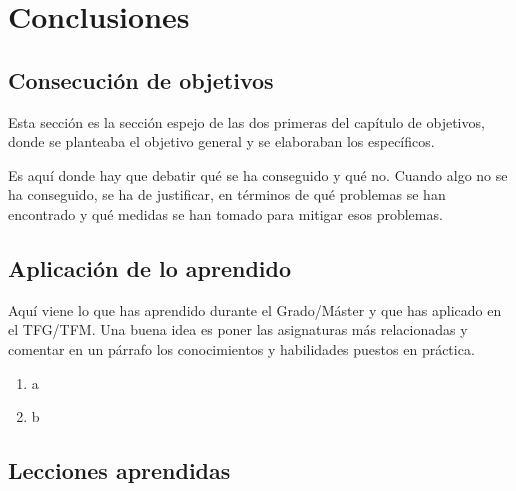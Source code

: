 \documentclass[a4paper, 12pt, english]{book}
\begin{document}




\cleardoublepage
\chapter{Conclusiones}
\label{chap:conclusiones}


\section{Consecución de objetivos}
\label{sec:consecucion-objetivos}

Esta sección es la sección espejo de las dos primeras del capítulo de objetivos, donde se planteaba el objetivo general y se elaboraban los específicos.

Es aquí donde hay que debatir qué se ha conseguido y qué no.
Cuando algo no se ha conseguido, se ha de justificar, en términos de qué problemas se han encontrado y qué medidas se han tomado para mitigar esos problemas.


\section{Aplicación de lo aprendido}
\label{sec:aplicacion}

Aquí viene lo que has aprendido durante el Grado/Máster y que has aplicado en el TFG/TFM. Una buena idea es poner las asignaturas más relacionadas y comentar en un párrafo los conocimientos y habilidades puestos en práctica.

\begin{enumerate}
  \item a
  \item b
\end{enumerate}


\section{Lecciones aprendidas}
\label{sec:lecciones_aprendidas}
\end{document}
